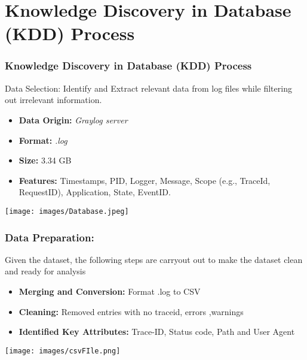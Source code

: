 \documentclass[10pt, a4paper]{beamer}
\begin{document}
	
	
\section{Knowledge Discovery in Database (KDD) Process}
\begin{frame}
	\frametitle{Knowledge Discovery in Database (KDD) Process}
	\begin{block}{Data Selection:}
		Identify and Extract relevant data from log files while filtering out irrelevant information.
		\begin{itemize}
			\item \textbf{Data Origin:} \textit{Graylog server} 
			\item \textbf{Format:} \textit{.log} 
			\item \textbf{Size:} 3.34 GB
			\item \textbf{Features:} Timestamps, PID, Logger, Message, Scope (e.g., TraceId, RequestID), Application, State, EventID.
		\end{itemize}
	\end{block}
	
	\centering
	\texttt{[image: images/Database.jpeg]} %
	
\centering
	
\end{frame}


	
	\begin{frame}
		\frametitle{Data Preparation:} 
		Given the dataset, the following steps are carryout out to make the dataset clean and ready for analysis
		\begin{block}{}
			\begin{itemize}
				\item \textbf{Merging and Conversion:} Format .log to CSV
				\item \textbf{Cleaning:} Removed entries with no traceid, errors ,warnings
				\item \textbf{Identified Key Attributes:} Trace-ID, Status code, Path and User Agent
			\end{itemize}
		\end{block}
		
		
		\centering
		\texttt{[image: images/csvFIle.png]} %
		
		\vskip 0.1cm %
		\centering
		
	\end{frame}
	
\end{document}
